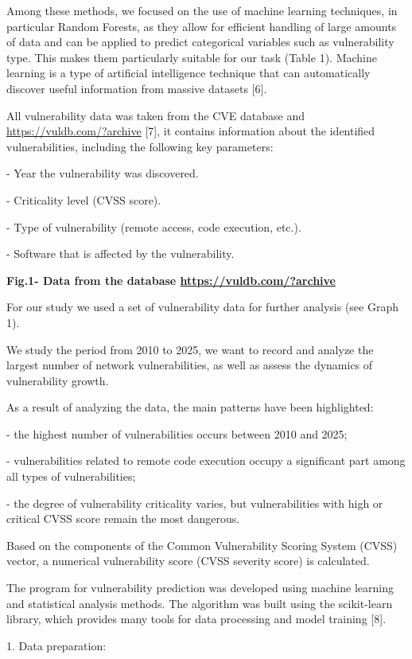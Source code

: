 Among these methods, we focused on the use of machine learning
techniques, in particular Random Forests, as they allow for efficient
handling of large amounts of data and can be applied to predict
categorical variables such as vulnerability type. This makes them
particularly suitable for our task (Table 1). Machine learning is a type
of artificial intelligence technique that can automatically discover
useful information from massive datasets {[}6{]}.

All vulnerability data was taken from the CVE database and
\url{https://vuldb.com/?archive} {[}7{]}, it contains information about
the identified vulnerabilities, including the following key parameters:

- Year the vulnerability was discovered.

- Criticality level (CVSS score).

- Type of vulnerability (remote access, code execution, etc.).

- Software that is affected by the vulnerability.

{\bfseries Fig.1- Data from the database \url{https://vuldb.com/?archive}}

For our study we used a set of vulnerability data for further analysis
(see Graph 1).

We study the period from 2010 to 2025, we want to record and analyze the
largest number of network vulnerabilities, as well as assess the
dynamics of vulnerability growth.

As a result of analyzing the data, the main patterns have been
highlighted:

- the highest number of vulnerabilities occurs between 2010 and 2025;

- vulnerabilities related to remote code execution occupy a significant
part among all types of vulnerabilities;

- the degree of vulnerability criticality varies, but vulnerabilities
with high or critical CVSS score remain the most dangerous.

Based on the components of the Common Vulnerability Scoring System
(CVSS) vector, a numerical vulnerability score (CVSS severity score) is
calculated.

The program for vulnerability prediction was developed using machine
learning and statistical analysis methods. The algorithm was built using
the scikit-learn library, which provides many tools for data processing
and model training {[}8{]}.

1. Data preparation:

